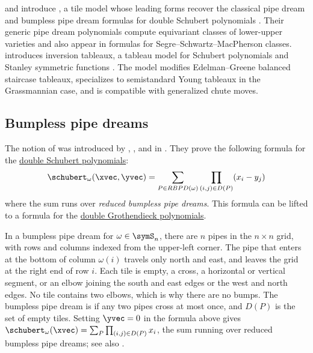  and  introduce
\label{genericPipeDream}, a tile model whose leading
forms recover the
classical pipe dream and bumpless pipe dream formulas for double Schubert
polynomials \cite{KnutsonZinnJustin2024x}.  Their generic pipe dream
polynomials compute equivariant classes of lower-upper varieties and also
appear in formulas for Segre--Schwartz--MacPherson classes.
 introduces inversion tableaux, a tableau model for
Schubert polynomials and Stanley symmetric functions
\cite{AxelrodFreed2025x}.  The model modifies Edelman--Greene balanced
staircase tableaux, specializes to semistandard Young tableaux in the
Grassmannian case, and is compatible with generalized chute moves.


\subsection[schubertBumplessPipeDream]{Bumpless pipe dreams}

The notion of \label{bumplessPipeDream} was introduced by
, , and  in \cite{LamLeeShimozono2018x}.
They prove the following formula for the \hyperref[schubertDouble]{double Schubert polynomials}:
\[
\schubert_\omega(\xvec,\yvec) = \sum_{P \in RBPD(\omega)} \prod_{(i,j)\in D(P)} (x_i - y_j)
\]
where the sum runs over \emph{reduced bumpless pipe dreams}.
This formula can be lifted to a formula for the
\hyperref[grothendieckDouble]{double Grothendieck polynomials}.

In a bumpless pipe dream for $\omega \in \symS_n$, there are $n$ pipes in the
$n \times n$ grid, with rows and columns indexed from the upper-left corner.
The pipe that enters at the bottom of column $\omega(i)$ travels only north
and east, and leaves the grid at the right end of row $i$.  Each tile is
empty, a cross, a horizontal or vertical segment, or an elbow joining the
south and east edges or the west and north edges.  No tile contains two
elbows, which is why there are no bumps.  The bumpless pipe dream is
 if any two pipes cross at most once, and $D(P)$ is the set of
empty tiles.  Setting $\yvec = 0$ in the formula above gives
$\schubert_\omega(\xvec) = \sum_{P} \prod_{(i,j) \in D(P)} x_i$, the sum running
over reduced bumpless pipe dreams; see also \cite[Thms.~4.3 and~4.8]{Weigandt2025x}.

